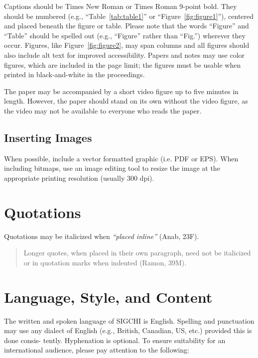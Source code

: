 \documentclass{sigchi}
\begin{document}
Captions should be Times New Roman or Times Roman 9-point bold.  They
should be numbered (e.g., ``Table~\ref{tab:table1}'' or
``Figure~\ref{fig:figure1}''), centered and placed beneath the figure
or table.  Please note that the words ``Figure'' and ``Table'' should
be spelled out (e.g., ``Figure'' rather than ``Fig.'') wherever they
occur. Figures, like Figure~\ref{fig:figure2}, may span columns and
all figures should also include alt text for improved accessibility.
Papers and notes may use color figures, which are included in the page
limit; the figures must be usable when printed in black-and-white in
the proceedings.

The paper may be accompanied by a short video figure up to five
minutes in length. However, the paper should stand on its own without
the video figure, as the video may not be available to everyone who
reads the paper.  

\subsection{Inserting Images}
When possible, include a vector formatted graphic (i.e. PDF or EPS).
When including bitmaps,  use an image editing tool to resize the image
at the appropriate printing resolution (usually 300 dpi).

\section{Quotations}
Quotations may be italicized when \textit{``placed inline''} (Anab,
23F).

\begin{quote}
Longer quotes, when placed in their own paragraph, need not be
italicized or in quotation marks when indented (Ramon, 39M).  
\end{quote}

\section{Language, Style, and Content}

The written and spoken language of SIGCHI is English. Spelling and
punctuation may use any dialect of English (e.g., British, Canadian,
US, etc.) provided this is done consis- tently. Hyphenation is
optional. To ensure suitability for an international audience, please
pay attention to the following:
\end{document}
